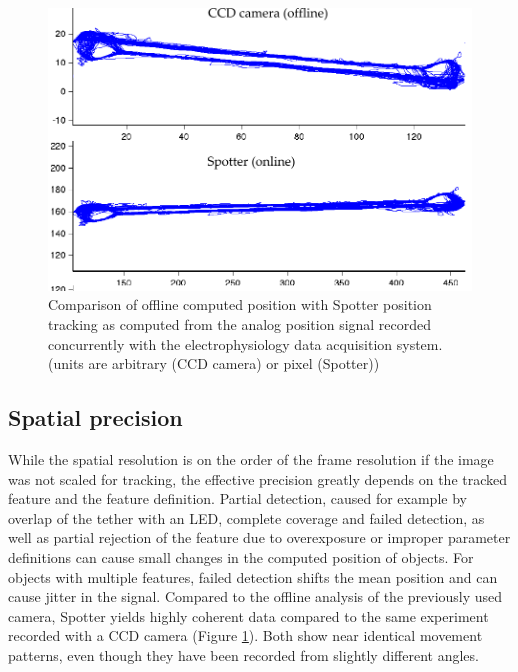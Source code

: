 \begin{figure}[ht] %
	\centering
		\includegraphics [width=\linewidth]{gfx/cameras.pdf} %
	\caption[Test]{Comparison of offline computed position with Spotter position tracking as computed from the analog position signal recorded concurrently with the electrophysiology data acquisition system. (units are arbitrary (CCD camera) or pixel (Spotter))}
	\label{fig:cameras}
\end{figure}

\subsection{Spatial precision}
\label{sec:SpatialPrecision}

While the spatial resolution is on the order of the frame resolution if the image was not scaled for tracking, the effective precision greatly depends on the tracked feature and the feature definition. Partial detection, caused for example by overlap of the tether with an LED, complete coverage and failed detection, as well as partial rejection of the feature due to overexposure or improper parameter definitions can cause small changes in the computed position of objects. For objects with multiple features, failed detection shifts the mean position and can cause jitter in the signal. Compared to the offline analysis of the previously used camera, Spotter yields highly coherent data compared to the same experiment recorded with a CCD camera (Figure \ref{fig:cameras}). Both show near identical movement patterns, even though they have been recorded from slightly different angles.


